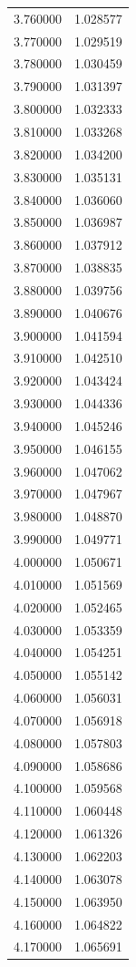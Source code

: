\begin{tabular}{rr}
3.760000 & 1.028577 \\
3.770000 & 1.029519 \\
3.780000 & 1.030459 \\
3.790000 & 1.031397 \\
3.800000 & 1.032333 \\
3.810000 & 1.033268 \\
3.820000 & 1.034200 \\
3.830000 & 1.035131 \\
3.840000 & 1.036060 \\
3.850000 & 1.036987 \\
3.860000 & 1.037912 \\
3.870000 & 1.038835 \\
3.880000 & 1.039756 \\
3.890000 & 1.040676 \\
3.900000 & 1.041594 \\
3.910000 & 1.042510 \\
3.920000 & 1.043424 \\
3.930000 & 1.044336 \\
3.940000 & 1.045246 \\
3.950000 & 1.046155 \\
3.960000 & 1.047062 \\
3.970000 & 1.047967 \\
3.980000 & 1.048870 \\
3.990000 & 1.049771 \\
4.000000 & 1.050671 \\
4.010000 & 1.051569 \\
4.020000 & 1.052465 \\
4.030000 & 1.053359 \\
4.040000 & 1.054251 \\
4.050000 & 1.055142 \\
4.060000 & 1.056031 \\
4.070000 & 1.056918 \\
4.080000 & 1.057803 \\
4.090000 & 1.058686 \\
4.100000 & 1.059568 \\
4.110000 & 1.060448 \\
4.120000 & 1.061326 \\
4.130000 & 1.062203 \\
4.140000 & 1.063078 \\
4.150000 & 1.063950 \\
4.160000 & 1.064822 \\
4.170000 & 1.065691 \\

\end{tabular}
